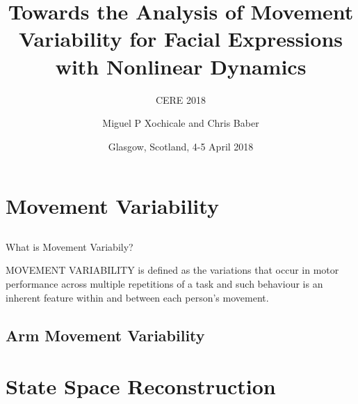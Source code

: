 \documentclass[compress]{beamer}
\title{Towards the Analysis of Movement Variability for Facial Expressions  \\ 
	with Nonlinear Dynamics}
\subtitle{CERE 2018}
\date{Glasgow, Scotland, 4-5 April 2018}
\author{Miguel P Xochicale and Chris Baber}
\institute{School of Engineering \\{\bf University of Birmingham}}
\begin{document}

\maketitle


%

%
\section{Movement Variability}


\subsection{}
{


\begin{frame}{What is Movement Variabily?}

\LARGE
MOVEMENT VARIABILITY is defined as the variations that occur in motor
performance across multiple repetitions of a task and such behaviour is 
an inherent feature within and between each person's movement.
\end{frame}
}

\subsection{Arm Movement Variability}




\section{State Space Reconstruction}

\end{document}
